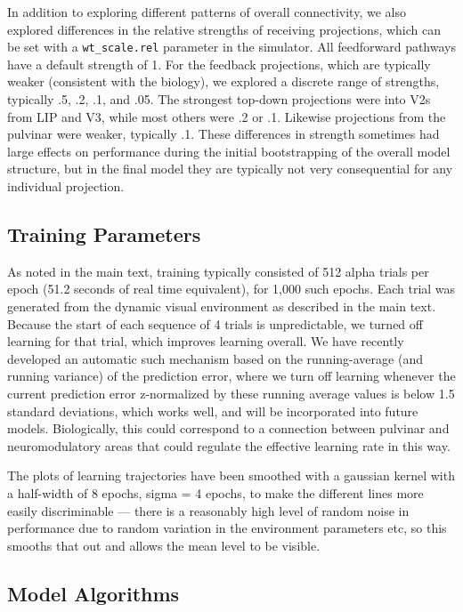 \documentclass[11pt,twoside]{article}
\newif\myifpdf
\begin{document}
In addition to exploring different patterns of overall connectivity, we also explored differences in the relative strengths of receiving projections, which can be set with a \texttt{wt\_scale.rel} parameter in the simulator.  All feedforward pathways have a default strength of 1.  For the feedback projections, which are typically weaker (consistent with the biology), we explored a discrete range of strengths, typically .5, .2, .1, and .05.  The strongest top-down projections were into V2s from LIP and V3, while most others were .2 or .1.  Likewise projections from the pulvinar were weaker, typically .1.  These differences in strength sometimes had large effects on performance during the initial bootstrapping of the overall model structure, but in the final model they are typically not very consequential for any individual projection.

\subsection{Training Parameters}

As noted in the main text, training typically consisted of 512 alpha trials per epoch (51.2 seconds of real time equivalent), for 1,000 such epochs.  Each trial was generated from the dynamic visual environment as described in the main text.  Because the start of each sequence of 4 trials is unpredictable, we turned off learning for that trial, which improves learning overall.  We have recently developed an automatic such mechanism based on the running-average (and running variance) of the prediction error, where we turn off learning whenever the current prediction error z-normalized by these running average values is below 1.5 standard deviations, which works well, and will be incorporated into future models.  Biologically, this could correspond to a connection between pulvinar and neuromodulatory areas that could regulate the effective learning rate in this way.

The plots of learning trajectories have been smoothed with a gaussian kernel with a half-width of 8 epochs, sigma = 4 epochs, to make the different lines more easily discriminable --- there is a reasonably high level of random noise in performance due to random variation in the environment parameters etc, so this smooths that out and allows the mean level to be visible.

\subsection{Model Algorithms}
\end{document}
